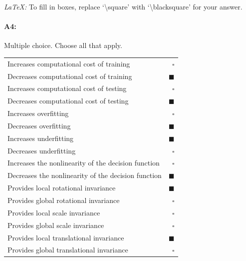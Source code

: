 \emph{LaTeX:} To fill in boxes, replace `\textbackslash square' with `\textbackslash blacksquare' for your answer.

\paragraph{A4:} Multiple choice. Choose all that apply.

\begin{tabular}[h]{lr}
    \toprule
    Increases computational cost of training            & $\square$      \\
    Decreases computational cost of training            & $\blacksquare$ \\
    Increases computational cost of testing             & $\square$      \\
    Decreases computational cost of testing             & $\blacksquare$ \\
    \midrule
    Increases overfitting                               & $\square$      \\
    Decreases overfitting                               & $\blacksquare$ \\
    Increases underfitting                              & $\blacksquare$ \\
    Decreases underfitting                              & $\square$      \\
    \midrule
    Increases the nonlinearity of the decision function & $\square$      \\
    Decreases the nonlinearity of the decision function & $\blacksquare$ \\
    \midrule
    Provides local rotational invariance                & $\blacksquare$ \\
    Provides global rotational invariance               & $\square$      \\
    Provides local scale invariance                     & $\square$      \\
    Provides global scale invariance                    & $\square$      \\
    Provides local translational invariance             & $\blacksquare$ \\
    Provides global translational invariance            & $\square$      \\
    \bottomrule
\end{tabular}


